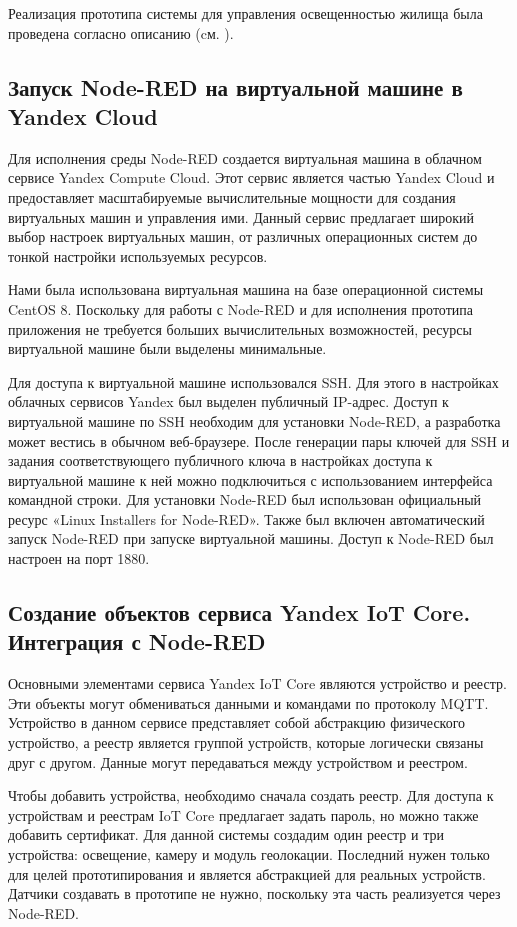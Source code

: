 Реализация прототипа системы для управления освещенностью
жилища была проведена согласно описанию (cм. ).

\subsection{Запуск Node-RED на виртуальной машине в Yandex Cloud}
Для исполнения среды Node-RED создается виртуальная машина в облачном сервисе Yandex Compute Cloud. Этот сервис является частью Yandex Cloud и предоставляет масштабируемые вычислительные мощности для создания виртуальных машин и управления ими. Данный сервис предлагает широкий выбор настроек виртуальных машин, от различных операционных систем до тонкой настройки используемых ресурсов.

Нами была использована виртуальная машина на базе операционной системы CentOS 8. Поскольку для работы с Node-RED и для исполнения прототипа приложения не требуется больших вычислительных возможностей, ресурсы виртуальной машине были выделены минимальные.

Для доступа к виртуальной машине использовался SSH. Для этого в настройках облачных сервисов Yandex был выделен публичный IP-адрес. Доступ к виртуальной машине по SSH необходим для установки Node-RED, а разработка может вестись в обычном веб-браузере. После генерации пары ключей для SSH и задания соответствующего публичного ключа в настройках доступа к виртуальной машине к ней можно подключиться с использованием интерфейса командной строки. Для установки Node-RED был использован официальный ресурс «Linux Installers for Node-RED». Также был включен автоматический запуск Node-RED при запуске виртуальной машины. Доступ к Node-RED был настроен на порт 1880.
\subsection {Создание объектов сервиса Yandex IoT Core. Интеграция с Node-RED}
Основными элементами сервиса Yandex IoT Core являются устройство и реестр. Эти объекты могут обмениваться данными и командами по протоколу MQTT. Устройство в данном сервисе представляет собой абстракцию физического устройство, а реестр является группой устройств, которые логически связаны друг с другом. Данные могут передаваться между устройством и реестром.

Чтобы добавить устройства, необходимо сначала создать реестр. Для доступа к устройствам и реестрам IoT Core предлагает задать пароль, но можно также добавить сертификат. Для данной системы создадим один реестр и три устройства: освещение, камеру и модуль геолокации. Последний нужен только для целей прототипирования и является абстракцией для реальных устройств. Датчики создавать в прототипе не нужно, поскольку эта часть реализуется через Node-RED.

